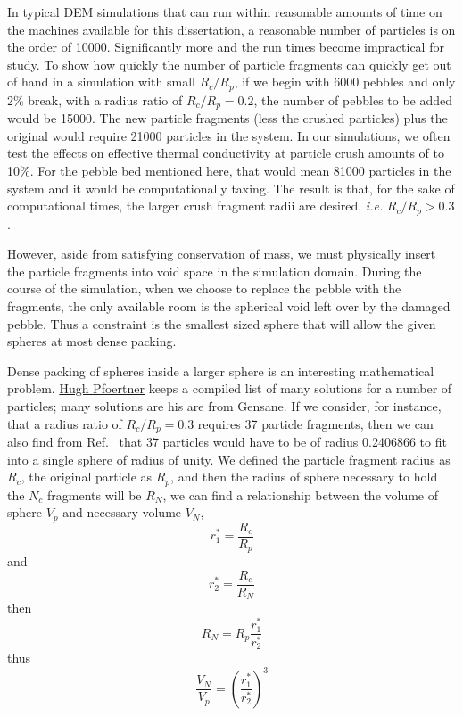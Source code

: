 In typical DEM simulations that can run within reasonable amounts of time on the machines available for this dissertation, a reasonable number of particles is on the order of \num{10000}. Significantly more and the run times become impractical for study. To show how quickly the number of particle fragments can quickly get out of hand in a simulation with small $R_c/R_p$, if we begin with \num{6000} pebbles and only 2\% break, with a radius ratio of $R_c/R_p = 0.2$, the number of pebbles to be added would be \num{15000}. The new particle fragments (less the crushed particles) plus the original would require \num{21000} particles in the system. In our simulations, we often test the effects on effective thermal conductivity at particle crush amounts of to 10\%. For the pebble bed mentioned here, that would mean \num{81000} particles in the system and it would be computationally taxing. The result is that, for the sake of computational times, the larger crush fragment radii are desired, \textit{i.e.} $R_c/R_p > 0.3$.

However, aside from satisfying conservation of mass, we must physically insert the particle fragments into void space in the simulation domain. During the course of the simulation, when we choose to replace the pebble with the fragments, the only available room is the spherical void left over by the damaged pebble. Thus a constraint is the smallest sized sphere that will allow the given spheres at most dense packing. 

Dense packing of spheres inside a larger sphere is an interesting mathematical problem. \href{http://www.randomwalk.de/sphere/insphr/spisbest.txt}{Hugh Pfoertner} keeps a compiled list of many solutions for a number of particles; many solutions are his are from Gensane.\cite{gensane2003dense} If we consider, for instance, that a radius ratio of $R_c/R_p = 0.3$ requires 37 particle fragments, then we can also find from Ref.~\cite{gensane2003dense} that 37 particles would have to be of radius 0.2406866 to fit into a single sphere of radius of unity. We defined the particle fragment radius as $R_c$, the original particle as $R_p$, and then the radius of sphere necessary to hold the $N_c$ fragments will be $R_N$, we can find a relationship between the volume of sphere $V_p$ and necessary volume $V_N$,
\begin{equation}
	r_1^* = \frac{R_c}{R_p}
\end{equation}
and
\begin{equation}
	r_2^* = \frac{R_c}{R_N}
\end{equation}
then 
\begin{equation}
	R_N = R_p \frac{r_1^*}{r_2^*}
\end{equation}
thus
\begin{equation}
	\frac{V_N}{V_p} = \left(\frac{r_1^*}{r_2^*}\right)^3
\end{equation}

